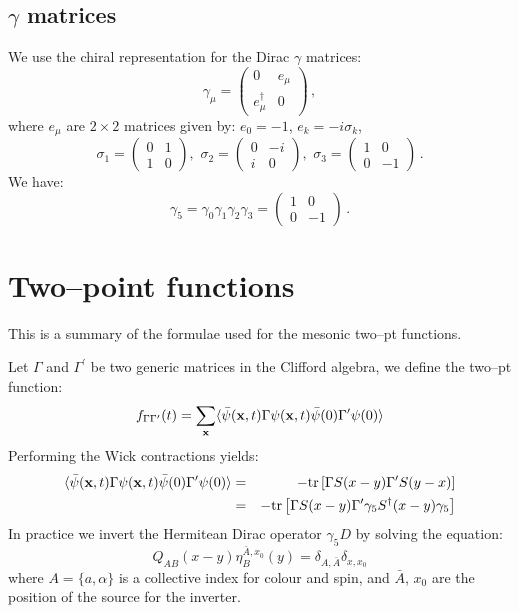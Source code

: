 \documentclass{article}[12pt]
\def\bfx{{\bf x}}
\begin{document}
\subsection{$\gamma$ matrices}
We use the chiral representation for the Dirac $\gamma$ matrices:
\begin{equation}
\gamma_\mu=
\begin{pmatrix}
0&e_\mu\\
e_\mu^\dagger&0
\end{pmatrix}\, ,
\end{equation}
where $e_\mu$ are $2\times 2$ matrices given by: $e_0=-1$, $e_k=-i\sigma_k$,
\begin{equation}
\sigma_1=
\begin{pmatrix}
0&1\\
1&0
\end{pmatrix},\,\,
\sigma_2=
\begin{pmatrix}
0&-i\\
i&0
\end{pmatrix},\,\,
\sigma_3=
\begin{pmatrix}
1&0\\
0&-1
\end{pmatrix}\, .
\end{equation}
We have:
\begin{equation}
\gamma_5=\gamma_0\gamma_1\gamma_2\gamma_3=
\begin{pmatrix}
1&0\\
0&-1
\end{pmatrix}\, .
\end{equation}



\section{Two--point functions}
This is a summary of the formulae used for the mesonic two--pt
functions. 

\bigskip

\noindent
Let $\Gamma$ and $\Gamma^\prime$ be two generic matrices in the
Clifford algebra, we define the two--pt function:
%
\begin{equation}
f_{\Gamma\Gamma^\prime}(t) = \sum_\bfx \langle \bar\psi(\bfx,t) \Gamma
\psi(\bfx,t) \bar\psi(0) \Gamma^\prime \psi(0) \rangle
\end{equation}
%
Performing the Wick contractions yields:
%
\begin{eqnarray}
\langle \bar\psi(\bfx,t) \Gamma
\psi(\bfx,t) \bar\psi(0) \Gamma^\prime \psi(0) \rangle &=&
- \mathrm{tr} \left[ \Gamma S(x-y) \Gamma^\prime S(y-x) \right] 
\nonumber \\
&=& - \mathrm{tr} \left[ \Gamma S(x-y) \Gamma^\prime \gamma_5 
S^\dagger(x-y) \gamma_5 \right] \nonumber 
\end{eqnarray}
%
In practice we invert the Hermitean Dirac operator $\gamma_5 D$ by
solving the equation:
%
\begin{equation}
Q_{AB}(x-y) \eta^{\bar A,x_0}_B(y) = \delta_{A,\bar A} \delta_{x,x_0}
\end{equation}
%
where $A=\{a,\alpha\}$ is a collective index for colour and spin, and
$\bar A$, $x_0$ are the position of the source for the inverter. 
\end{document}
